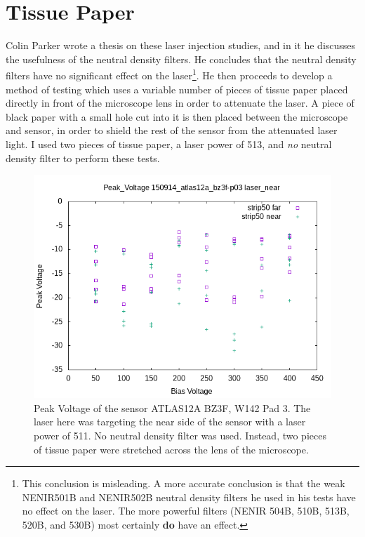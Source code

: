 \documentclass{report}
\begin{document}
        \section{Tissue Paper}
            Colin Parker wrote a thesis on these laser injection studies, and in it he discusses the usefulness of the neutral density filters. He concludes that the neutral density filters have no significant effect on the laser\footnote{This conclusion is misleading. A more accurate conclusion is that the weak NENIR501B and NENIR502B neutral density filters he used in his tests have no effect on the laser. The more powerful filters (NENIR 504B, 510B, 513B, 520B, and 530B) most certainly \textbf{do} have an effect.}. He then proceeds to develop a method of testing which uses a variable number of pieces of tissue paper placed directly in front of the microscope lens in order to attenuate the laser. A piece of black paper with a small hole cut into it is then placed between the microscope and sensor, in order to shield the rest of the sensor from the attenuated laser light.
            I used two pieces of tissue paper, a laser power of 513, and \textit{no} neutral density filter to perform these tests.

            \begin{figure}[h] 
                \includegraphics[height=.4\textheight]{Peak_Voltage__150914_atlas12a_bz3f-p03__laser_near}
                \centering
                \caption{ Peak Voltage of the sensor ATLAS12A BZ3F, W142 Pad 3. The laser here was targeting the near side of the sensor with a laser power of 511. No neutral density filter was used. Instead, two pieces of tissue paper were stretched across the lens of the microscope. }
                \label{fig:Peak_Voltage__150914_atlas12a_bz3f-p03__laser_near}
            \end{figure}
\end{document}
